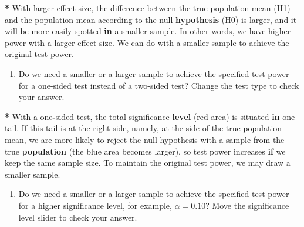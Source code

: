 \documentclass[a4paper]{book}
\newenvironment{Shaded}{\begin{snugshade}}{\end{snugshade}}
\newcommand{\KeywordTok}[1]{\textcolor[rgb]{0,0,0}{\textbf{#1}}}
\newcommand{\DecValTok}[1]{\textcolor[rgb]{0.00,0.00,0.00}{#1}}
\newcommand{\StringTok}[1]{\textcolor[rgb]{0.00,0.00,0.00}{#1}}
\newcommand{\ControlFlowTok}[1]{\textcolor[rgb]{0.00,0.00,0.00}{\textbf{#1}}}
\newcommand{\OperatorTok}[1]{\textcolor[rgb]{0.00,0.00,0.00}{\textbf{#1}}}
\newcommand{\NormalTok}[1]{#1}
\providecommand{\tightlist}{%
  \setlength{\itemsep}{0pt}\setlength{\parskip}{0pt}}
\theoremstyle{definition}
\theoremstyle{definition}
\theoremstyle{definition}
\theoremstyle{remark}
\begin{document}
\begin{Shaded}
\begin{Highlighting}[]
\OperatorTok{*}\StringTok{ }\NormalTok{With larger effect size, the difference between the true population mean}
\NormalTok{(H1) and the population mean according to the null }\KeywordTok{hypothesis}\NormalTok{ (H0) is}
\NormalTok{larger, and it will be more easily spotted }\ControlFlowTok{in}\NormalTok{ a smaller sample. In other words,}
\NormalTok{we have higher power with a larger effect size. We can do with a smaller sample to}
\NormalTok{achieve the original test power.}
\end{Highlighting}
\end{Shaded}

\begin{enumerate}
\def\labelenumi{\arabic{enumi}.}
\setcounter{enumi}{3}
\tightlist
\item
  Do we need a smaller or a larger sample to achieve the specified test
  power for a one-sided test instead of a two-sided test? Change the
  test type to check your answer.
\end{enumerate}

\begin{Shaded}
\begin{Highlighting}[]
\OperatorTok{*}\StringTok{ }\NormalTok{With a one}\OperatorTok{-}\NormalTok{sided test, the total significance }\KeywordTok{level}\NormalTok{ (red area) is situated }\ControlFlowTok{in}
\NormalTok{one tail. If this tail is at the right side, namely, at the side of the true}
\NormalTok{population mean, we are more likely to reject the null hypothesis with a sample}
\NormalTok{from the true }\KeywordTok{population}\NormalTok{ (the blue area becomes larger), so test power}
\NormalTok{increases }\ControlFlowTok{if}\NormalTok{ we keep the same sample size. To maintain the original test power,}
\NormalTok{we may draw a smaller sample.}
\end{Highlighting}
\end{Shaded}

\begin{enumerate}
\def\labelenumi{\arabic{enumi}.}
\setcounter{enumi}{4}
\tightlist
\item
  Do we need a smaller or a larger sample to achieve the specified test
  power for a higher significance level, for example, \(\alpha = 0.10\)?
  Move the significance level slider to check your answer.
\end{enumerate}

\begin{Shaded}
\end{Shaded}
\end{document}
